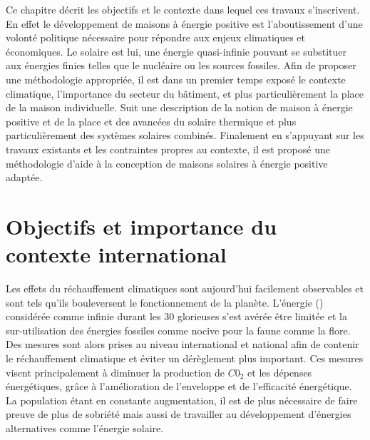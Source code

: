 


Ce chapitre décrit les objectifs et le contexte dans lequel ces travaux s’inscrivent. En
effet le développement de maisons à énergie positive est l’aboutissement d’une volonté
politique nécessaire pour répondre aux enjeux climatiques et économiques. Le solaire est
lui, une énergie quasi-infinie pouvant se substituer aux énergies finies telles que le
nucléaire ou les sources fossiles. Afin de proposer une méthodologie appropriée, il est
dans un premier temps exposé le contexte climatique, l’importance du secteur du bâtiment,
et plus particulièrement la place de la maison individuelle. Suit une description de la
notion de maison à énergie positive et de la place et des avancées du solaire thermique et
plus particulièrement des systèmes solaires combinés. Finalement en s’appuyant sur les
travaux existants et les contraintes propres au contexte, il est proposé une méthodologie
d’aide à la conception de maisons solaires à énergie positive adaptée.
\clearpage



\section{Objectifs et importance du contexte international} %
\label{sec:objectifs_et_importance_du_contexte_international}
Les effets du réchauffement climatiques sont aujourd’hui facilement observables et sont
tels qu’ils bouleversent le fonctionnement de la planète. L’énergie ()
considérée comme infinie durant les \num{30} glorieuses s’est avérée être limitée et la
sur-utilisation des énergies fossiles comme nocive pour la faune comme la flore. Des
mesures sont alors prises au niveau international et national afin de contenir le
réchauffement climatique et éviter un dérèglement plus important. Ces mesures visent
principalement à diminuer la production de $C0_{2}$ et les dépenses énergétiques, grâce à
l’amélioration de l’enveloppe et de l’efficacité énergétique. La population étant en
constante augmentation, il est de plus nécessaire de faire preuve de plus de sobriété mais
aussi de travailler au développement d’énergies alternatives comme l’énergie solaire.

